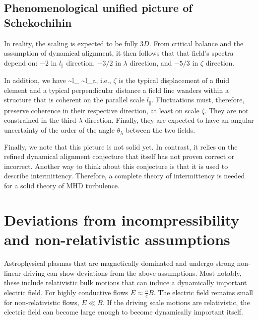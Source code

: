 \documentclass[usenatbib,twocolumn]{aastex63}
\begin{document}
\subsection{Phenomenological unified picture of Schekochihin}

In reality, the scaling is expected to be fully $3D$.
From critical balance and the assumption of dynamical alignment, it then follows that that field's spectra depend on:
$-2$ in $l_\parallel$ direction,
$-3/2$ in $\lambda$ direction, and
$-5/3$ in $\zeta$ direction.

In addition, we have
\be
\zeta \sim l_\parallel {} \sim l_\parallel {}a,
\ee
i.e., $\zeta$ is the typical displacement of a fluid element and a typical perpendicular distance a field line wanders within a structure that is coherent on the parallel scale $l_\parallel$.
Fluctuations must, therefore, preserve coherence in their respective direction, at least on scale $\zeta$.
They are not constrained in the third $\lambda$ direction.
Finally, they are expected to have an angular uncertainty of the order of the angle $\theta_\lambda$ between the two fields.

Finally, we note that this picture is not solid yet.
In contrast, it relies on the refined dynamical alignment conjecture that itself has not proven correct or incorrect.
Another way to think about this conjecture is that it is used to describe intermittency.
Therefore, a complete theory of intermittency is needed for a solid theory of MHD turbulence.



\section{Deviations from incompressibility and non-relativistic assumptions}\label{sect:kin_theory}


Astrophysical plasmas that are magnetically dominated and undergo strong non-linear driving can show deviations from the above assumptions.
Most notably, these include relativistic bulk motions that can induce a dynamically important electric field.
For highly conductive flows $E \approx \frac{u}{c} B$.
The electric field remains small for non-relativistic flows, $E \ll B$.
If the driving scale motions are relativistic, the electric field can become large enough to become dynamically important itself.
\end{document}
